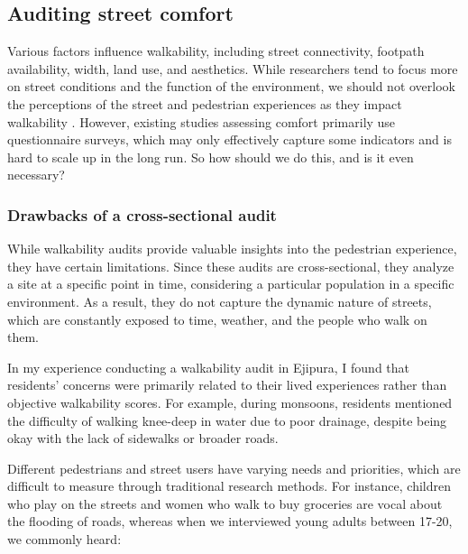 \documentclass[
]{latex/krantz}
\begin{document}
\clearpage

\hypertarget{street-comfort-qualitative}{%
\subsection{Auditing street comfort}\label{street-comfort-qualitative}}

Various factors influence walkability, including street connectivity, footpath availability, width, land use, and aesthetics. While researchers tend to focus more on street conditions and the function of the environment, we should not overlook the perceptions of the street and pedestrian experiences as they impact walkability \autocite{tongDevelopingMultiscaleWalkability}. However, existing studies assessing comfort primarily use questionnaire surveys, which may only effectively capture some indicators and is hard to scale up in the long run. So how should we do this, and is it even necessary?

\hypertarget{drawbacks-of-a-cross-sectional-audit}{%
\subsubsection{Drawbacks of a cross-sectional audit}\label{drawbacks-of-a-cross-sectional-audit}}

While walkability audits provide valuable insights into the pedestrian experience, they have certain limitations. Since these audits are cross-sectional, they analyze a site at a specific point in time, considering a particular population in a specific environment. As a result, they do not capture the dynamic nature of streets, which are constantly exposed to time, weather, and the people who walk on them.

In my experience conducting a walkability audit in Ejipura, I found that residents' concerns were primarily related to their lived experiences rather than objective walkability scores. For example, during monsoons, residents mentioned the difficulty of walking knee-deep in water due to poor drainage, despite being okay with the lack of sidewalks or broader roads.

Different pedestrians and street users have varying needs and priorities, which are difficult to measure through traditional research methods. For instance, children who play on the streets and women who walk to buy groceries are vocal about the flooding of roads, whereas when we interviewed young adults between 17-20, we commonly heard:
\end{document}
